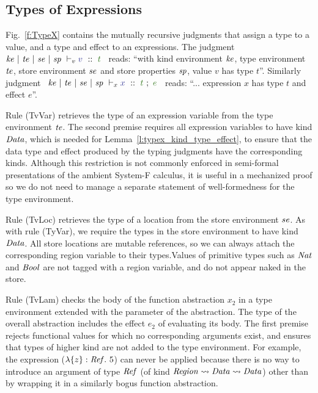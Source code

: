 
\subsection{Types of Expressions}
Fig.~\ref{f:TypeX} contains the mutually recursive judgments that assign a type to a value, and a type and effect to an expressions. The judgment ~$\TypeV{\mke}{\mte}{\mse}{\msp}{v}{t}$~ reads: ``with kind environment $\mathit{ke}$, type environment $\mathit{te}$, store environment $\mathit{se}$ and store properties $\mathit{sp}$, value $v$ has type $t$''. Similarly judgment ~$\TypeX{\mke}{\mte}{\mse}{\msp}{x}{t}{e}$~ reads: ``... expression $x$ has type $t$ and effect $e$''.

Rule (TvVar) retrieves the type of an expression variable from the type environment $\mathit{te}$. The second premise requires all expression variables to have kind $\mathit{Data}$, which is needed for Lemma~\ref{l:typex_kind_type_effect}, to ensure that the data type and effect produced by the typing judgments have the corresponding kinds. Although this restriction is not commonly enforced in semi-formal presentations of the ambient System-F calculus, it is useful in a mechanized proof so we do not need to manage a separate statement of well-formedness for the type environment.

Rule (TvLoc) retrieves the type of a location from the store environment $\mathit{se}$. As with rule (TyVar), we require the types in the store environment to have kind $\mathit{Data}$. All store locations are mutable references, so we can always attach the corresponding region variable to their types.Values of primitive types such as $\mathit{Nat}$ and $\mathit{Bool}$ are not tagged with a region variable, and do not appear naked in the store.

Rule (TvLam) checks the body of the function abstraction $x_2$ in a type environment extended with the parameter of the abstraction. The type of the overall abstraction includes the effect $e_2$ of evaluating its body. The first premise rejects functional values for which no corresponding arguments exist, and ensures that types of higher kind are not added to the type environment. For example, the expression ($\lambda \{z\} : \mathit{Ref}.~ 5$) can never be applied because there is no way to introduce an argument of type $\mathit{Ref}$ (of kind $\mathit{Region} \rightsquigarrow \mathit{Data} \rightsquigarrow \mathit{Data}$) other than by wrapping it in a similarly bogus function abstraction.

